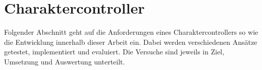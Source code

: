 \chapter{Charaktercontroller}
\label{sec:charaktercontroller}
Folgender Abschnitt geht auf die Anforderungen eines Charaktercontrollers so wie die Entwicklung innerhalb dieser Arbeit ein. Dabei werden verschiedenen Ansätze getestet, implementiert und evaluiert. Die Versuche sind jeweils in Ziel, Umsetzung und Auswertung unterteilt.




